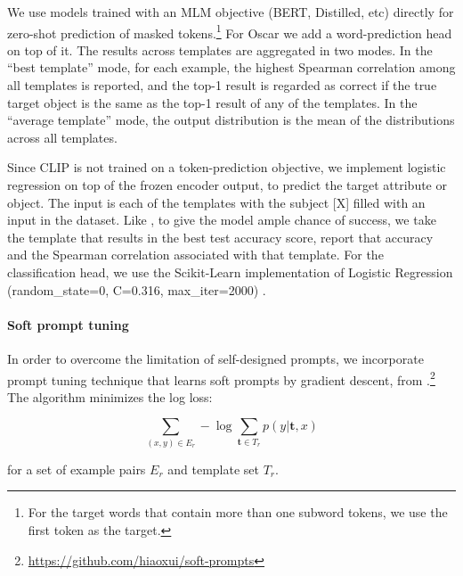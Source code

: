 \documentclass[11pt]{article}
\begin{document}
We use models trained with an MLM objective (BERT,  Distilled, etc) directly for zero-shot prediction of masked tokens.\footnote{For the target words that contain more than one subword tokens, we use the first token as the target.}
For Oscar we  add a word-prediction head on top of it.
The results across templates are aggregated in two modes.
In the ``best template'' mode, for each example, the highest Spearman correlation among all templates is reported, and the top-1 result is regarded as correct if the true target object is the same as the top-1 result of any of the templates.
In the ``average template'' mode, the output distribution is the mean of the distributions across all templates.

Since CLIP is not trained on a token-prediction objective, we implement logistic regression on top of the frozen encoder output, to predict the target attribute or object. The input is each of the templates with the subject [X] filled with an input in the dataset. Like \citet{paik-etal-2021-world}, to give the model ample chance of success, we take the template that results in the best test accuracy score, report that accuracy and the Spearman correlation associated with that template.
For the classification head, we use the Scikit-Learn implementation of Logistic Regression (random\_state=0, C=0.316, max\_iter=2000) \citep{scikit-learn}.

\paragraph{Soft prompt tuning}

In order to overcome the limitation of self-designed prompts, we incorporate prompt tuning technique that learns soft prompts by gradient descent, from \citet{soft-prompt}.\footnote{\url{https://github.com/hiaoxui/soft-prompts}} The algorithm minimizes the log loss:

$$\sum\limits_{(x,y) \in E_r} - \log \sum\limits_{\textbf{t} \in T_r} p(y | \textbf{t}, x)$$

\noindent for a set of example pairs $E_r$ and template set $T_r$.
\end{document}
